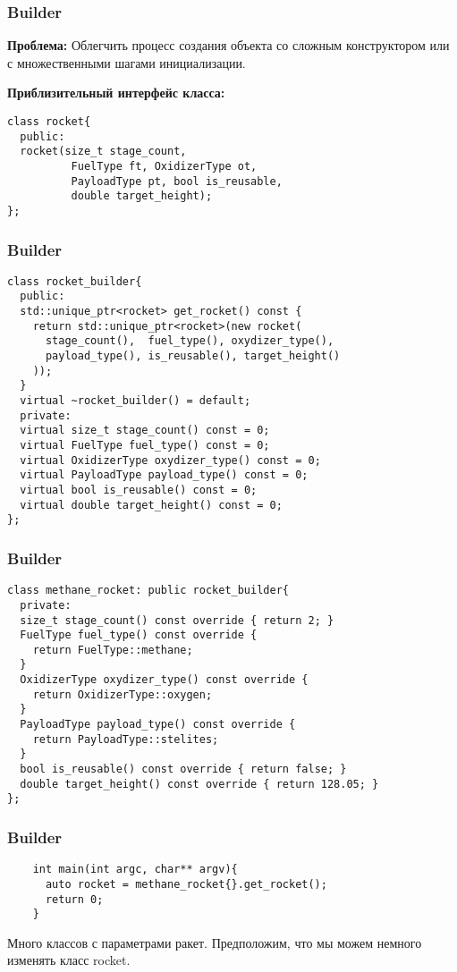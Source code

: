 \begin{frame}[fragile]
  \frametitle{Builder}
  \textbf{Проблема:} Облегчить процесс создания объекта со сложным конструктором или 
  с множественными шагами инициализации. 
  
  \vspace{10pt}
  \bf{Приблизительный интерфейс класса:}
  \begin{verbatim}
class rocket{
  public:
  rocket(size_t stage_count, 
          FuelType ft, OxidizerType ot, 
          PayloadType pt, bool is_reusable, 
          double target_height);
};
  \end{verbatim}
\end{frame}

\begin{frame}[fragile]
  \frametitle{Builder}
  \begin{verbatim}
class rocket_builder{
  public:
  std::unique_ptr<rocket> get_rocket() const {
    return std::unique_ptr<rocket>(new rocket(
      stage_count(),  fuel_type(), oxydizer_type(),
      payload_type(), is_reusable(), target_height()
    ));
  }
  virtual ~rocket_builder() = default;
  private:
  virtual size_t stage_count() const = 0;
  virtual FuelType fuel_type() const = 0;
  virtual OxidizerType oxydizer_type() const = 0;
  virtual PayloadType payload_type() const = 0;
  virtual bool is_reusable() const = 0;
  virtual double target_height() const = 0;
};
  \end{verbatim}
\end{frame}

\begin{frame}[fragile]
  \frametitle{Builder}
  \begin{verbatim}
class methane_rocket: public rocket_builder{
  private:
  size_t stage_count() const override { return 2; }
  FuelType fuel_type() const override { 
    return FuelType::methane; 
  }
  OxidizerType oxydizer_type() const override { 
    return OxidizerType::oxygen; 
  }
  PayloadType payload_type() const override { 
    return PayloadType::stelites; 
  }
  bool is_reusable() const override { return false; }
  double target_height() const override { return 128.05; }
};

  \end{verbatim}
\end{frame}

\begin{frame}[fragile]
  \frametitle{Builder}
  \begin{verbatim}
    int main(int argc, char** argv){
      auto rocket = methane_rocket{}.get_rocket();
      return 0;
    }
  \end{verbatim}

  Много классов с параметрами ракет. Предположим, что мы можем немного изменять класс rocket.
\end{frame}

